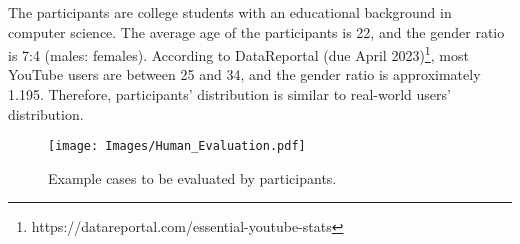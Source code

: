 The participants are college students with an educational background in computer science. The average age of the participants is 22, and the gender ratio is 7:4 (males: females). According to DataReportal (due April 2023)\footnote{https://datareportal.com/essential-youtube-stats}, most YouTube users are between 25 and 34, and the gender ratio is approximately 1.195. Therefore, participants' distribution is similar to real-world users' distribution.

\begin{figure*}[b]
    \centering
    \texttt{[image: Images/Human\_Evaluation.pdf]}
    \vspace{-8pt}
    \caption{Example cases to be evaluated by participants.}
    \label{fig: human eval}
\end{figure*}

